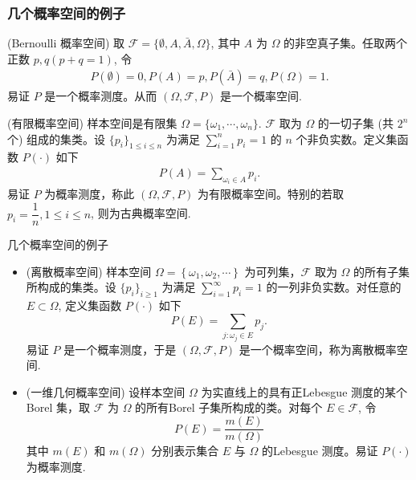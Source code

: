 \begin{frame}%
	\frametitle{几个概率空间的例子}
	\begin{exam}({\rm Bernoulli} 概率空间) 取 $\mathcal{F}=\{\emptyset, A, \bar{A}, \Omega\}$, 其中 $A$ 为 $\Omega$ 的非空真子集。任取两个正数 $p,q (p+q=1)$, 令
		\begin{eqnarray*}
			P(\emptyset)=0,  P(A)=p, P(\bar{A})=q, P(\Omega)=1.
		\end{eqnarray*}
		易证 $P$ 是一个概率测度。从而 $(\Omega,\mathcal{F},P)$ 是一个概率空间.
	\end{exam}

	\pause

	\begin{exam}(有限概率空间) 样本空间是有限集 $\Omega=\{\omega_1,\cdots,\omega_n\}$. $\mathcal{F}$ 取为 $\Omega$ 的一切子集 (共 $2^n$ 个) 组成的集类。设 $\{p_i\}_{1\leq i\leq n}$ 为满足 $\sum_{i=1}^np_i=1$ 的 $n$ 个非负实数。定义集函数 $P (\cdot)$ 如下
		\begin{eqnarray*}
			P(A)=\sum_{\omega_i\in A}p_i.
		\end{eqnarray*}
		易证 $P$ 为概率测度，称此 $(\Omega,\mathcal{F},P)$ 为有限概率空间。特别的若取 $p_i=\dfrac{1}{n}, 1\leq i\leq n$, 则为古典概率空间.

	\end{exam}


\end{frame}

\begin{frame}{几个概率空间的例子}
	\begin{itemize}[<+-|alert@+>]
		\item \begin{exam}
			      (离散概率空间) 样本空间 $\Omega=\left\{\omega_{1}, \omega_{2},\cdots\right\}$ 为可列集，$\mathcal{F}$ 取为 $\Omega$ 的所有子集所构成的集类。设 $\{p_i\}_{i\geq 1}$ 为满足 $\sum_{i=1}^\infty p_i=1$ 的一列非负实数。对任意的 $E\subset\Omega$, 定义集函数 $P (\cdot)$ 如下
			      $$
				      P(E)=\sum_{j:\omega_j\in E} p_{j}.
			      $$
			      易证 $P$ 是一个概率测度，于是 $(\Omega, \mathcal{F}, P)$ 是一个概率空间，称为离散概率空间.
		      \end{exam}
		\item \begin{exam}
			      (一维几何概率空间) 设样本空间 $\Omega$ 为实直线上的具有正{\rm Lebesgue} 测度的某个{\rm Borel} 集，取 $\mathcal{F}$ 为 $\Omega$ 的所有{\rm Borel} 子集所构成的类。对每个 $E\in \mathcal{F}$, 令
			      $$
				      P(E)=\frac{m(E)}{m(\Omega)}
			      $$
			      其中 $m (E)$ 和 $m (\Omega)$ 分别表示集合 $E$ 与 $\Omega$ 的{\rm Lebesgue} 测度。易证 $P (\cdot)$ 为概率测度.
		      \end{exam}
	\end{itemize}
\end{frame}
